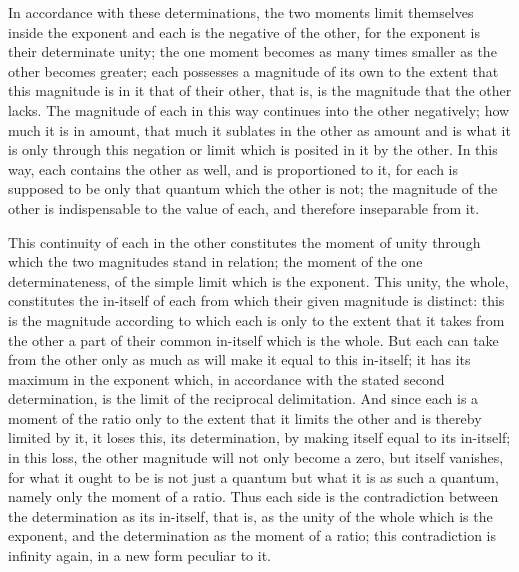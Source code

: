 In accordance with these determinations,
the two moments limit themselves inside the exponent
and each is the negative of the other,
for the exponent is their determinate unity;
the one moment becomes as many
times smaller as the other becomes greater;
each possesses a magnitude of its own
to the extent that this magnitude is in it that of their other,
that is, is the magnitude that the other lacks.
The magnitude of each in this way
continues into the other negatively;
how much it is in amount,
that much it sublates in the other as amount
and is what it is only through this negation
or limit which is posited in it by the other.
In this way, each contains the other as well,
and is proportioned to it,
for each is supposed to be only that quantum
which the other is not;
the magnitude of the other is
indispensable to the value of each,
and therefore inseparable from it.

This continuity of each in the other
constitutes the moment of unity
through which the two magnitudes stand in relation;
the moment of the one determinateness,
of the simple limit which is the exponent.
This unity, the whole, constitutes the in-itself
of each from which their given magnitude is distinct:
this is the magnitude according to which each is
only to the extent that it takes from the other
a part of their common in-itself which is the whole.
But each can take from the other only as much
as will make it equal to this in-itself;
it has its maximum in the exponent
which, in accordance with the stated second determination,
is the limit of the reciprocal delimitation.
And since each is a moment of the ratio only
to the extent that it limits the other
and is thereby limited by it,
it loses this, its determination,
by making itself equal to its in-itself;
in this loss, the other magnitude will not only
become a zero, but itself vanishes,
for what it ought to be is not just a quantum
but what it is as such a quantum,
namely only the moment of a ratio.
Thus each side is the contradiction
between the determination as its in-itself,
that is, as the unity of the whole which is the exponent,
and the determination as the moment of a ratio;
this contradiction is infinity again,
in a new form peculiar to it.


